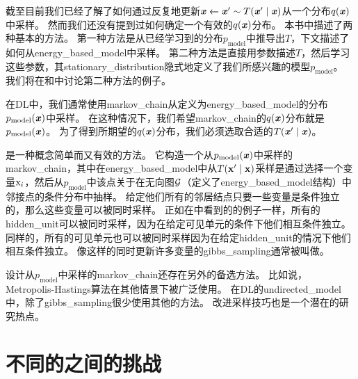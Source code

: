 截至目前我们已经了解了如何通过反复地更新$\boldsymbol{\mathit{x}} \xleftarrow{} \boldsymbol{\mathit{x}}'\sim T(\boldsymbol{\mathit{x}}'\mid\boldsymbol{\mathit{x}})$从一个分布$q(\boldsymbol{\mathit{x}})$中采样。
然而我们还没有提到过如何确定一个有效的$q(\boldsymbol{\mathit{x}})$分布。
本书中描述了两种基本的方法。
第一种方法是从已经学习到的分布$p_{\text{model}}$中推导出$T$，下文描述了如何从\gls{energy_based_model}中采样。
第二种方法是直接用参数描述$T$，然后学习这些参数，其\gls{stationary_distribution}隐式地定义了我们所感兴趣的模型$p_{\text{model}}$。
我们将在和中讨论第二种方法的例子。


在\gls{DL}中，我们通常使用\gls{markov_chain}从定义为\gls{energy_based_model}的分布$p_{\text{model}}(\boldsymbol{\mathit{x}})$中采样。
在这种情况下，我们希望\gls{markov_chain}的$q(\boldsymbol{\mathit{x}})$分布就是$p_{\text{model}}(\boldsymbol{\mathit{x}})$。
为了得到所期望的$q(\boldsymbol{\mathit{x}})$分布，我们必须选取合适的$T(\boldsymbol{\mathit{x}}'\mid \boldsymbol{\mathit{x}})$。


是一种概念简单而又有效的方法。
它构造一个从$p_{\text{model}}(\boldsymbol{\mathit{x}})$中采样的\gls{markov_chain}，其中在\gls{energy_based_model}中从$T(\mathbf{x}'\mid \mathbf{x})$采样是通过选择一个变量$\mathrm{x}_i$，然后从$p_{\text{model}}$中该点关于在无向图$\mathcal{G}$（定义了\gls{energy_based_model}结构）中邻接点的条件分布中抽样。
给定他们所有的邻居结点只要一些变量是条件独立的，那么这些变量可以被同时采样。
正如在中看到的的例子一样，所有的\gls{hidden_unit}可以被同时采样，因为在给定可见单元的条件下他们相互条件独立。
同样的，所有的可见单元也可以被同时采样因为在给定\gls{hidden_unit}的情况下他们相互条件独立。
像这样的同时更新许多变量的\gls{gibbs_sampling}通常被叫做。

设计从$p_{\text{model}}$中采样的\gls{markov_chain}还存在另外的备选方法。
比如说，Metropolis-Hastings算法在其他情景下被广泛使用。
在\gls{DL}的\gls{undirected_model}中，除了\gls{gibbs_sampling}很少使用其他的方法。
改进采样技巧也是一个潜在的研究热点。


\section{不同的之间的挑战}
\label{sec:the_challenge_of_mixing_between_separated_modes}

